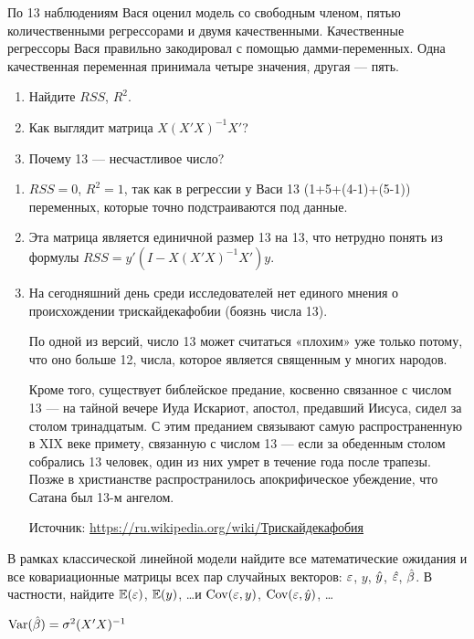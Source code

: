 \begin{problem}
По 13 наблюдениям Вася оценил модель со свободным членом, пятью количественными регрессорами и двумя качественными. Качественные регрессоры Вася правильно закодировал с помощью дамми-переменных. Одна качественная переменная принимала четыре значения, другая — пять.

\begin{enumerate}
\item Найдите $RSS$, $R^2$.
\item Как выглядит матрица $X(X'X)^{-1}X'$?
\item Почему 13 — несчастливое число?
\end{enumerate}


\begin{sol}
\begin{enumerate}
\item $RSS=0$, $R^2=1$, так как в регрессии у Васи 13 (1+5+(4-1)+(5-1)) переменных, которые точно подстраиваются под данные.
\item Эта матрица является единичной размер 13 на 13, что нетрудно понять из формулы $RSS=y'(I-X(X'X)^{-1}X')y$.
\item На сегодняшний день среди исследователей нет единого мнения о происхождении трискайдекафобии (боязнь числа 13).

По одной из версий, число 13 может считаться «плохим» уже только потому, что оно больше 12, числа, которое является священным у многих народов.

Кроме того, существует библейское предание, косвенно связанное с числом 13 — на тайной вечере Иуда Искариот, апостол, предавший Иисуса, сидел за столом тринадцатым. С этим преданием связывают самую распространенную в XIX веке примету, связанную с числом 13 — если за обеденным столом собрались 13 человек, один из них умрет в течение года после трапезы. Позже в христианстве распространилось апокрифическое убеждение, что Сатана был 13-м ангелом.

Источник: \href{https://ru.wikipedia.org/wiki/%D0%A2%D1%80%D0%B8%D1%81%D0%BA%D0%B0%D0%B9%D0%B4%D0%B5%D0%BA%D0%B0%D1%84%D0%BE%D0%B1%D0%B8%D1%8F}{https://ru.wikipedia.org/wiki/Трискайдекафобия}
\end{enumerate}
\end{sol}
\end{problem}



\begin{problem}
В рамках классической линейной модели найдите все математические ожидания и все ковариационные матрицы всех пар случайных векторов: $\varepsilon$, $y$, $\hat{y}$, $\hat{\varepsilon}$, $\hat{\beta}$. В частности, найдите $\mathbb{E}(\varepsilon)$, $\mathbb{E}(y)$, \ldots и $\operatorname{Cov}(\varepsilon,y)$, $\operatorname{Cov}(\varepsilon,\hat{y})$, \ldots


\begin{sol}
$\operatorname{Var}(\hat{\beta})=\sigma^2 (X'X)^{-1}$
\end{sol}
\end{problem}




